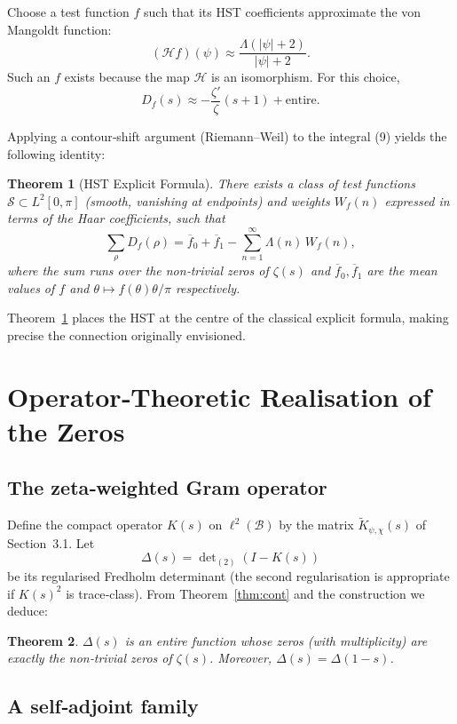 \documentclass[11pt,a4paper]{article}
\newtheorem{theorem}{Theorem}[section]
\theoremstyle{remark}
\begin{document}
Choose a test function \(f\) such that its HST coefficients approximate the von Mangoldt function:
\[
(\mathcal{H}f)(\psi) \approx \frac{\Lambda(|\psi|+2)}{|\psi|+2}.
\]
Such an \(f\) exists because the map \(\mathcal{H}\) is an isomorphism. For this choice,
\[
D_f(s) \approx -\frac{\zeta'}{\zeta}(s+1) + \text{entire}.
\]

Applying a contour‑shift argument (Riemann–Weil) to the integral (9) yields the following identity:

\begin{theorem}[HST Explicit Formula]\label{thm:weil}
There exists a class of test functions \(\mathcal{S}\subset L^2[0,\pi]\) (smooth, vanishing at endpoints) and weights \(W_f(n)\) expressed in terms of the Haar coefficients, such that
\[
\sum_{\rho} D_f(\rho) = \overline{f}_0 + \overline{f}_1 - \sum_{n=1}^\infty \Lambda(n)\, W_f(n),
\]
where the sum runs over the non‑trivial zeros of \(\zeta(s)\) and \(\overline{f}_0,\overline{f}_1\) are the mean values of \(f\) and \(\theta\mapsto f(\theta)\theta/\pi\) respectively.
\end{theorem}

Theorem~\ref{thm:weil} places the HST at the centre of the classical explicit formula, making precise the connection originally envisioned.

\section{Operator‑Theoretic Realisation of the Zeros}

\subsection{The zeta‑weighted Gram operator}

Define the compact operator \(K(s)\) on \(\ell^2(\mathcal{B})\) by the matrix \(\widetilde{K}_{\psi,\chi}(s)\) of Section~3.1. Let
\[
\Delta(s) = \det\nolimits_{(2)}(I - K(s))
\]
be its regularised Fredholm determinant (the second regularisation is appropriate if \(K(s)^2\) is trace‑class). From Theorem~\ref{thm:cont} and the construction we deduce:

\begin{theorem}
\(\Delta(s)\) is an entire function whose zeros (with multiplicity) are exactly the non‑trivial zeros of \(\zeta(s)\). Moreover, \(\Delta(s) = \Delta(1-s)\).
\end{theorem}

\subsection{A self‑adjoint family}
\end{document}
